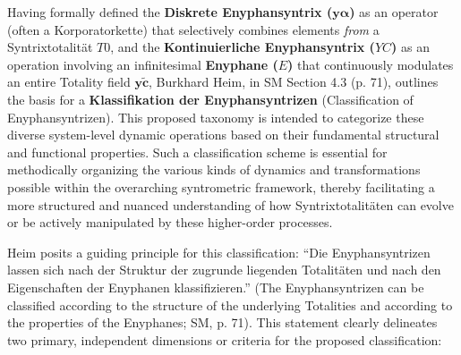 \documentclass[
    12pt,              %
    a4paper,           %
    headings=normal,   %
    twoside=true,      %
    BCOR=8mm,          %
]{scrbook}
\newcommand{\q}[1]{\enquote{#1}}
\newcommand{\syntrixtotalitaet}{T0}
\newcommand{\diskreteEnyphansyntrix}{\bm{y\alpha}}
\newcommand{\kontinuierlicheEnyphansyntrix}{YC}
\newcommand{\enyphane}{E}
\begin{document}
Having formally defined the \textbf{Diskrete Enyphansyntrix (\(\diskreteEnyphansyntrix\))} as an operator (often a Korporatorkette) that selectively combines elements \textit{from} a Syntrixtotalität \(\syntrixtotalitaet\), and the \textbf{Kontinuierliche Enyphansyntrix (\(\kontinuierlicheEnyphansyntrix\))} as an operation involving an infinitesimal \textbf{Enyphane (\(\enyphane\))} that continuously modulates an entire Totality field \(\bm{y\widetilde{c}}\), Burkhard Heim, in SM Section 4.3 (p. 71), outlines the basis for a \textbf{Klassifikation der Enyphansyntrizen} (Classification of Enyphansyntrizen). This proposed taxonomy is intended to categorize these diverse system-level dynamic operations based on their fundamental structural and functional properties. Such a classification scheme is essential for methodically organizing the various kinds of dynamics and transformations possible within the overarching syntrometric framework, thereby facilitating a more structured and nuanced understanding of how Syntrixtotalitäten can evolve or be actively manipulated by these higher-order processes.

Heim posits a guiding principle for this classification: \q{Die Enyphansyntrizen lassen sich nach der Struktur der zugrunde liegenden Totalitäten und nach den Eigenschaften der Enyphanen klassifizieren.} (The Enyphansyntrizen can be classified according to the structure of the underlying Totalities and according to the properties of the Enyphanes; SM, p. 71). This statement clearly delineates two primary, independent dimensions or criteria for the proposed classification:
\end{document}
